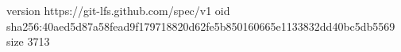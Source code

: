 version https://git-lfs.github.com/spec/v1
oid sha256:40aed5d87a58fead9f179718820d62fe5b850160665e1133832dd40bc5db5569
size 3713
